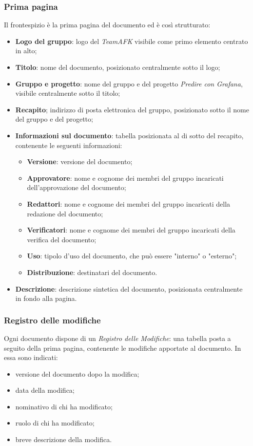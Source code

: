 \subsubsection{Prima pagina}
Il frontespizio è la prima pagina del documento ed è così strutturato:\begin{itemize}
\item \textbf{Logo del gruppo}: logo del \textit{TeamAFK} visibile come primo elemento centrato in alto;
\item \textbf{Titolo}: nome del documento, posizionato centralmente sotto il logo;
\item \textbf{Gruppo e progetto}: nome del gruppo e del progetto \textit{Predire con Grafana}, visibile centralmente sotto il titolo;
\item \textbf{Recapito}; indirizzo di posta elettronica del gruppo, posizionato sotto il nome del gruppo e del progetto;
\item \textbf{Informazioni sul documento}: tabella posizionata al di sotto del recapito, contenente le seguenti informazioni: \begin{itemize}
\item \textbf{Versione}: versione del documento;
\item \textbf{Approvatore}: nome e cognome dei membri del gruppo incaricati dell'approvazione del documento;
\item \textbf{Redattori}: nome e cognome dei membri del gruppo incaricati della redazione del documento;
\item \textbf{Verificatori}: nome e cognome dei membri del gruppo incaricati della verifica del documento;
\item \textbf{Uso}: tipolo d'uso del documento, che può essere "interno" o "esterno";
\item \textbf{Distribuzione}: destinatari del documento.
\end{itemize}
\item \textbf{Descrizione}: descrizione sintetica del documento, posizionata centralmente in fondo alla pagina.
\end{itemize}

\subsubsection{Registro delle modifiche}
Ogni documento dispone di un \textit{Registro delle Modifiche}: una tabella posta a seguito della prima pagina, contenente le modifiche apportate al documento. In essa sono indicati: \begin{itemize}
\item versione del documento dopo la modifica;
\item data della modifica;
\item nominativo di chi ha modificato;
\item ruolo di chi ha modificato;
\item breve descrizione della modifica.
\end{itemize}

